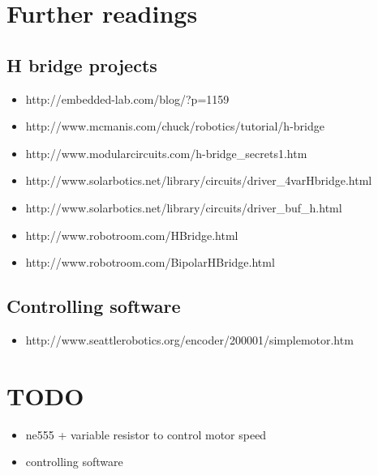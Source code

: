 \documentclass[12pt]{article}
\begin{document}
\newpage
\section{Further readings}

\subsection{H bridge projects}
\begin{itemize}
  \item http://embedded-lab.com/blog/?p=1159
  \item http://www.mcmanis.com/chuck/robotics/tutorial/h-bridge
  \item http://www.modularcircuits.com/h-bridge\_secrets1.htm
  \item http://www.solarbotics.net/library/circuits/driver\_4varHbridge.html
  \item http://www.solarbotics.net/library/circuits/driver\_buf\_h.html
  \item http://www.robotroom.com/HBridge.html
  \item http://www.robotroom.com/BipolarHBridge.html
\end{itemize}

\subsection{Controlling software}
\begin{itemize}
  \item http://www.seattlerobotics.org/encoder/200001/simplemotor.htm
\end{itemize}


\section{TODO}

\begin{itemize}
\item ne555 + variable resistor to control motor speed
\item controlling software 
\end{itemize}
\end{document}
